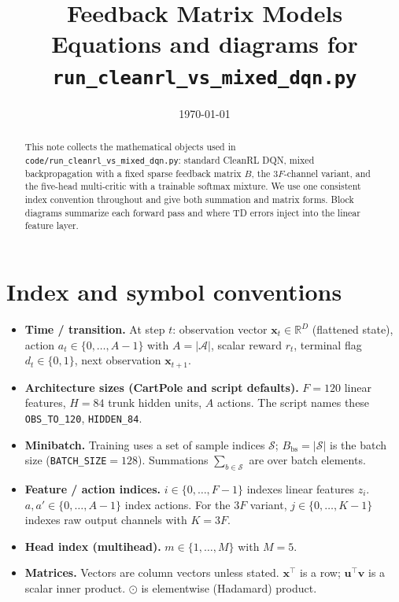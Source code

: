 \documentclass[11pt]{article}
\title{Feedback Matrix Models\\\large Equations and diagrams for \texttt{run\_cleanrl\_vs\_mixed\_dqn.py}}
\author{}
\date{\today}
\begin{document}
\maketitle

\begin{abstract}
This note collects the mathematical objects used in \texttt{code/run\_cleanrl\_vs\_mixed\_dqn.py}: standard CleanRL DQN, mixed backpropagation with a fixed sparse feedback matrix $B$, the $3F$-channel variant, and the five-head multi-critic with a trainable softmax mixture. We use one consistent index convention throughout and give both summation and matrix forms. Block diagrams summarize each forward pass and where TD errors inject into the linear feature layer.
\end{abstract}

\section{Index and symbol conventions}
\label{sec:indices}

\begin{itemize}
  \item \textbf{Time / transition.} At step $t$: observation vector $\mathbf{x}_t \in \mathbb{R}^{D}$ (flattened state), action $a_t \in \{0,\ldots,A-1\}$ with $A = |\mathcal{A}|$, scalar reward $r_t$, terminal flag $d_t \in \{0,1\}$, next observation $\mathbf{x}_{t+1}$.
  \item \textbf{Architecture sizes (CartPole and script defaults).} $F=120$ linear features, $H=84$ trunk hidden units, $A$ actions. The script names these \texttt{OBS\_TO\_120}, \texttt{HIDDEN\_84}.
  \item \textbf{Minibatch.} Training uses a set of sample indices $\mathcal{S}$; $B_{\mathrm{bs}} = |\mathcal{S}|$ is the batch size (\texttt{BATCH\_SIZE}${}=128$). Summations $\sum_{b \in \mathcal{S}}$ are over batch elements.
  \item \textbf{Feature / action indices.} $i \in \{0,\ldots,F-1\}$ indexes linear features $z_i$. $a,a' \in \{0,\ldots,A-1\}$ index actions. For the $3F$ variant, $j \in \{0,\ldots,K-1\}$ indexes raw output channels with $K=3F$.
  \item \textbf{Head index (multihead).} $m \in \{1,\ldots,M\}$ with $M=5$.
  \item \textbf{Matrices.} Vectors are column vectors unless stated. $\mathbf{x}^\top$ is a row; $\mathbf{u}^\top\mathbf{v}$ is a scalar inner product. $\odot$ is elementwise (Hadamard) product.
\end{itemize}
\end{document}
